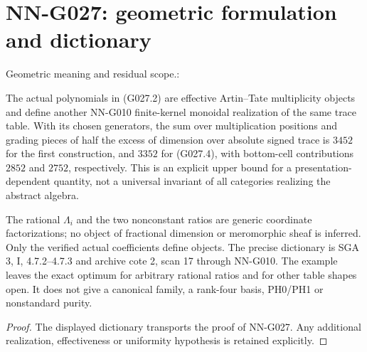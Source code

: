 \section{NN-G027: geometric formulation and dictionary}
\begin{geometricstatement}[NN-G027]
Geometric meaning and residual scope.:

The actual polynomials in (G027.2) are effective
Artin--Tate multiplicity objects and define another
NN-G010 finite-kernel monoidal realization of the
same trace table. With its chosen generators, the
sum over multiplication positions and grading pieces
of half the excess of dimension over absolute signed
trace is $3452$ for the first construction, and $3352$
for (G027.4), with bottom-cell contributions $2852$
and $2752$, respectively.
This is an explicit upper bound for a presentation-dependent
quantity, not a universal invariant of all categories
realizing the abstract algebra.

The rational $\Lambda_i$ and the two nonconstant ratios
are generic coordinate factorizations; no object of
fractional dimension or meromorphic sheaf is inferred.
Only the verified actual coefficients define objects.
The precise dictionary is SGA 3, I, 4.7.2--4.7.3 and
archive cote 2, scan 17 through NN-G010. The example
leaves the exact optimum for arbitrary rational ratios
and for other table shapes open. It does not give a
canonical family, a rank-four basis, PH0/PH1 or
nonstandard purity.


\end{geometricstatement}
\begin{proof} The displayed dictionary transports the proof of NN-G027. Any additional realization, effectiveness or uniformity hypothesis is retained explicitly.\end{proof}


